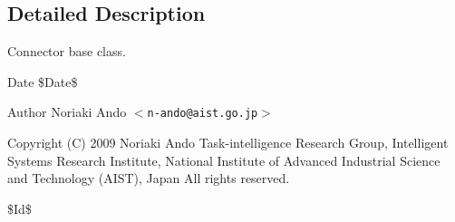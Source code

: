 \subsection{Detailed Description}
Connector base class. \begin{DoxyDate}{Date}
\$Date\$ 
\end{DoxyDate}
\begin{DoxyAuthor}{Author}
Noriaki Ando $<${\tt n-\/ando@aist.go.jp}$>$
\end{DoxyAuthor}
Copyright (C) 2009 Noriaki Ando Task-\/intelligence Research Group, Intelligent Systems Research Institute, National Institute of Advanced Industrial Science and Technology (AIST), Japan All rights reserved.

\$Id\$ 